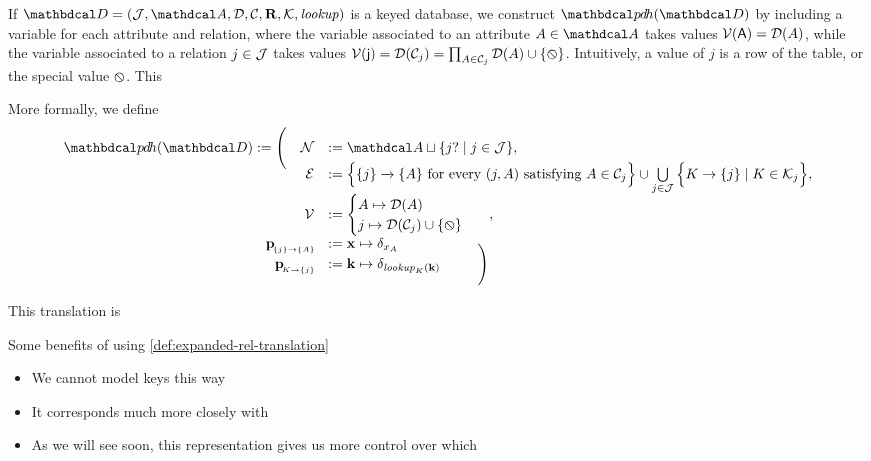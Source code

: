 \documentclass[the-pdg-manual.tex]{subfiles}
\begin{document}
\begin{defn}\label{def:expanded-rel-translation}
    If $\D = (\Idx,\Attrs,\Doms,\Cols,\Rels,\Keys, \mathit{lookup})$ is a keyed database, we construct $\PDHof\D$ by 
    including a variable for each attribute and relation, where the variable associated to an attribute $A \in \Attrs$ takes values $\mathcal V(\mathsf{A}) = {\mathcal D}(A)$, while the variable associated to a relation $j \in \mathcal J$ takes values $\mathcal V(\mathsf{j}) = {\mathcal D}(\mathcal C_j) = \prod_{A \in \mathcal C_j}{\mathcal D}(A) \cup \{\varobslash\}$. Intuitively, a value of $j$ is a row of the table, or the special value $\varobslash$. This 
    
    More formally, we define
    \[ 
    \begin{array}{rl}%
        \PDHof{\D} := \Bigg(\quad	\N &:=  \Attrs \sqcup \{ j? \mid j \in \Idx\},
        \\[-0.5em]
        \Ed &:= \Big\{ \ed{}{\{j\}}{\{A\}} \text{ for every }(j,A)\text{ satisfying } A\in \Cols_j \Big\}
            \cup \bigcup\limits_{j \in \Idx}\Big\{ K \to \{ j \} \mid K \in \Keys_j\Big\},  
         \\[0.5em]
        \V &:= 
        \begin{cases}
            A \mapsto \Doms(A) \\
            j \mapsto \Doms(\Cols_j) \cup \{\none\}
        \end{cases}~~, %
        \\
        \bp[\{j\}\to\{A\}] &:= \mat x \mapsto \delta_{x_{A}}
        \\[-0.7em]
        \bp[K\to\{j\}] &:= \mat k \mapsto \delta_{\mathit{lookup}_K(\mat k)}~~\qquad \Bigg)

    \end{array} 
    \]
\end{defn}

This translation is

\begin{defn}\label{def:compact-rel-translation}
	
\end{defn}
Some benefits of using \cref{def:expanded-rel-translation}
\begin{itemize}[nosep]
	\item We cannot model keys this way
	\item It corresponds much more closely with 
	\item As we will see soon, this representation gives us more control over which 
\end{itemize}
\end{document}
